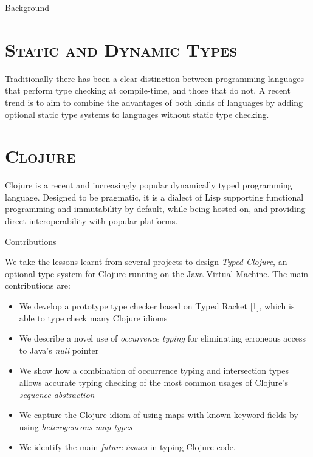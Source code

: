 \documentclass[landscape,final,a0paper,fontscale=0.277]{baposter}
\begin{document}
\begin{poster}
  \begin{posterbox}[name=problem,column=0,row=0]{Background}

\section*{\textsc{Static and Dynamic Types}}

Traditionally there has been a clear distinction between 
programming languages that perform type checking at compile-time, and those that do not.
A recent trend is to aim to combine the advantages of both kinds of languages by adding optional static 
type systems to languages without static type checking.

\section*{\textsc{Clojure}}

Clojure is a recent and increasingly popular dynamically typed programming language.
Designed to be pragmatic, it is a dialect of Lisp supporting functional programming and immutability by default,
while being hosted on, and providing direct interoperability with popular platforms.
\end{posterbox}

\begin{posterbox}[name=contribution,column=0,below=problem]{Contributions}

We take the lessons learnt from several projects to design \emph{Typed Clojure},
an optional type system for Clojure running on the Java Virtual Machine. 
The main contributions are:
\begin{itemize}
  \item We develop a prototype type checker based on Typed Racket [1], which is able to type check many Clojure idioms
  \item We describe a novel use of \emph{occurrence typing} for eliminating erroneous access to Java's \emph{null} pointer
  \item We show how a combination of occurrence typing and intersection types allows accurate typing checking of
        the most common usages of Clojure's \emph{sequence abstraction} 
  \item We capture the Clojure idiom of using maps with known keyword fields by using \emph{heterogeneous map types}
  \item We identify the main \emph{future issues} in typing Clojure code.


\end{itemize}
\end{posterbox}
\end{poster}
\end{document}
